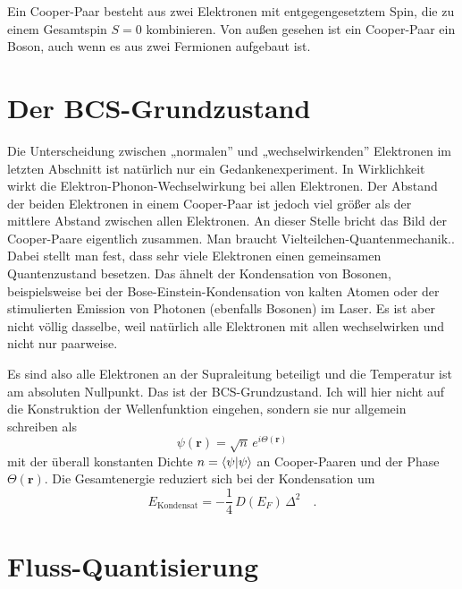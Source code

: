 Ein Cooper-Paar besteht aus zwei Elektronen mit entgegengesetztem Spin, die zu einem Gesamtspin $S=0$ kombinieren. Von außen gesehen ist ein Cooper-Paar ein Boson, auch wenn es aus zwei Fermionen aufgebaut ist.


\section*{Der BCS-Grundzustand}

Die Unterscheidung zwischen „normalen” und „wechselwirkenden” Elektronen im letzten Abschnitt ist natürlich nur ein Gedankenexperiment. In Wirklichkeit wirkt die Elektron-Phonon-Wechselwirkung bei allen Elektronen. Der Abstand der beiden Elektronen in einem Cooper-Paar ist jedoch viel größer als der mittlere Abstand zwischen allen Elektronen. An dieser Stelle bricht das Bild der Cooper-Paare eigentlich zusammen. Man braucht Vielteilchen-Quantenmechanik.. Dabei stellt man fest, dass sehr viele Elektronen einen gemeinsamen Quantenzustand besetzen.
Das ähnelt der Kondensation von Bosonen, beispielsweise bei der Bose-Einstein-Kondensation von kalten Atomen oder der stimulierten Emission von Photonen (ebenfalls Bosonen) im Laser. Es ist aber nicht völlig dasselbe, weil natürlich alle Elektronen mit allen wechselwirken und nicht nur paarweise.

Es sind also alle Elektronen an der Supraleitung beteiligt und die Temperatur ist am absoluten Nullpunkt. Das ist der 
BCS-Grundzustand. Ich will hier nicht auf die Konstruktion der Wellenfunktion eingehen, sondern sie nur allgemein schreiben als
\begin{equation}
    \psi(\bm{r}) = \sqrt{n} \, e^{i \Theta(\bm{r})}
\end{equation}
mit der überall konstanten Dichte $n = \braket{\psi | \psi}$ an Cooper-Paaren und der Phase $\Theta(\bm{r})$. Die  Gesamtenergie reduziert sich bei der Kondensation um %
\begin{equation}
    E_\text{Kondensat} = - \frac{1}{4} \, D(E_F) \, \Delta^2 \quad . \label{eq:6_E_kondensation}
\end{equation}


\section*{Fluss-Quantisierung}

